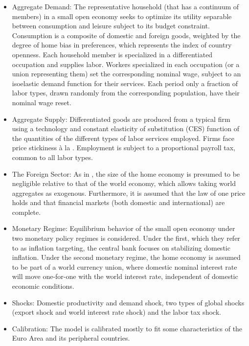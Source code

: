 \documentclass[11pt,a4paper]{article}
\begin{document}
	\begin{itemize}
		\item Aggregate Demand: The representative household (that has a continuum of members) in a small open economy seeks to optimize its utility separable between consumption and leisure subject to its budget constraint. Consumption is a composite of domestic and foreign goods, weighted by the degree of home bias in preferences, which represents the index of country openness. Each household member is specialized in a differentiated occupation and supplies labor. Workers specialized in each occupation (or a union representing them) set the corresponding nominal wage, subject to an isoelastic demand function for their services. Each period only a fraction of labor types, drawn randomly from the corresponding population, have their nominal wage reset.
		
		\item Aggregate Supply: Differentiated goods are produced from a typical firm using a technology and constant elasticity of substitution (CES) function of the quantities of the different types of labor services employed. Firms face price stickiness \`{a} la \cite{Calvo1983}. Employment is subject to a proportional payroll tax, common to all labor types.
		
		\item The Foreign Sector: As in \cite{GaliMonacelli2005}, the size of the home economy is presumed to be negligible relative to that of the world economy, which allows taking world aggregates as exogenous. Furthermore, it is assumed that the law of one price holds and that financial markets (both domestic and international) are complete.
		
		\item Monetary Regime: Equilibrium behavior of the small open economy under two monetary policy regimes is considered. Under the first, which they refer to as inflation targeting, the central bank focuses on stabilizing domestic inflation. Under the second monetary regime, the home economy is assumed to be part of a world currency union, where domestic nominal interest rate will move one-for-one with the world interest rate, independent of domestic economic conditions.
		
		\item Shocks: Domestic productivity and demand shock, two types of global shocks (export shock and world interest rate shock) and the labor tax shock.
		
		\item Calibration: The model is calibrated mostly to fit some characteristics of the Euro Area and its peripheral countries.
	\end{itemize}
	
\end{document}
